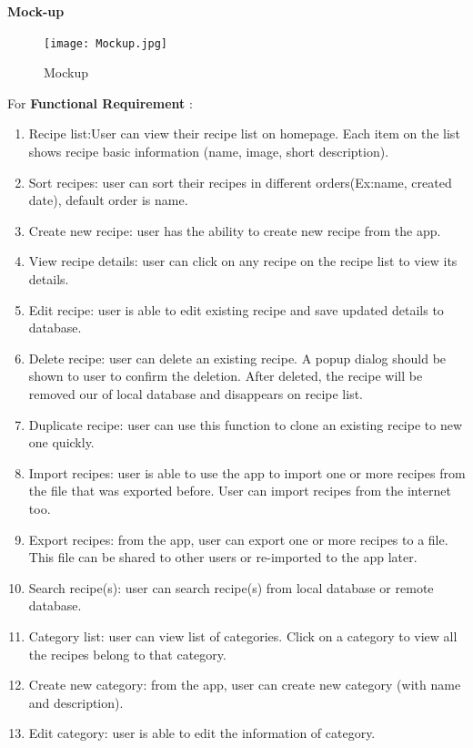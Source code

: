 \documentclass{article}
\begin{document}
\textbf{ Mock-up}

\begin{figure}[h!]
\centerin
\texttt{[image: Mockup.jpg]}
\caption{Mockup}
\label{fig:Mockup}
\end{figure}

    For \textbf{ Functional Requirement} :   \\
    \begin{enumerate}
        \item  Recipe list:User can view their recipe list on homepage. Each item on the list shows recipe basic information (name, image, short description). \\
        \item Sort recipes: user can sort their recipes in different orders(Ex:name, created date), default order is name. 
        \item Create new recipe: user has the ability to create new recipe from the app.
        \item View recipe details: user can click on any recipe on the recipe list to view its details.
        \item Edit recipe: user is able to edit existing recipe and save updated details to database.
        \item Delete recipe: user can delete an existing recipe. A popup dialog should be shown to user to confirm the deletion. After deleted, the recipe will be removed our of local database and disappears on recipe list.
        \item  Duplicate recipe: user can use this function to clone an existing recipe to new one quickly.
        \item Import recipes: user is able to use the app to import one or more recipes from the file that was exported before. User can import recipes from the internet too.
        \item Export recipes: from the app, user can export one or more recipes to a file. This file can be shared to other users or re-imported to the app later.
        \item Search recipe(s): user can search recipe(s) from local database or remote database.
        \item Category list: user can view list of categories. Click on a category to view all the recipes belong to that category.
        \item Create new category: from the app, user can create new category (with name and description).
        \item Edit category: user is able to edit the information of category.

\end{enumerate}
\end{document}
